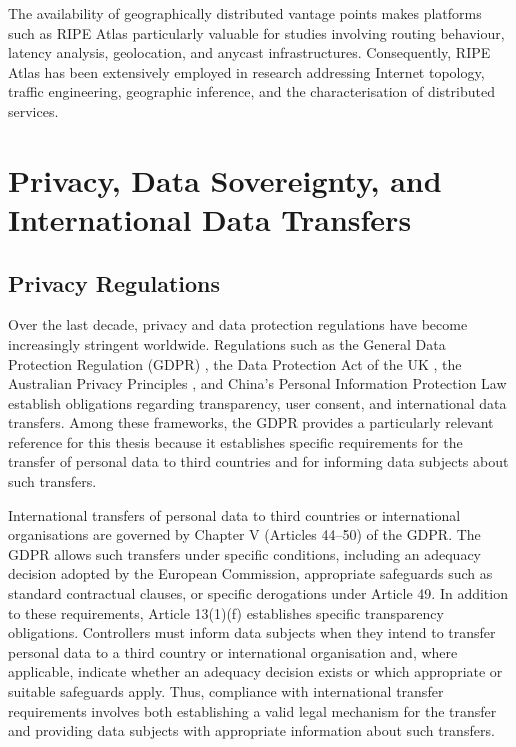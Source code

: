 The availability of geographically distributed vantage points makes platforms such as RIPE Atlas particularly valuable for studies involving routing behaviour, latency analysis, geolocation, and anycast infrastructures. Consequently, RIPE Atlas has been extensively employed in research addressing Internet topology, traffic engineering, geographic inference, and the characterisation of distributed services.

\section{Privacy, Data Sovereignty, and International Data Transfers}
\label{sc:background_privacy}

\subsection{Privacy Regulations}
\label{sc:background_privacy_regulations}

Over the last decade, privacy and data protection regulations have become increasingly stringent worldwide. Regulations such as the General Data Protection Regulation (GDPR) \cite{REGULATIONSRelevance}, the Data Protection Act of the UK \cite{Data2018}, the Australian Privacy Principles \cite{ReadOAIC}, and China's Personal Information Protection Law \cite{TheTranslation} establish obligations regarding transparency, user consent, and international data transfers. Among these frameworks, the GDPR provides a particularly relevant reference for this thesis because it establishes specific requirements for the transfer of personal data to third countries and for informing data subjects about such transfers.

International transfers of personal data to third countries or international organisations are governed by Chapter V (Articles 44--50) of the GDPR. The GDPR allows such transfers under specific conditions, including an adequacy decision adopted by the European Commission, appropriate safeguards such as standard contractual clauses, or specific derogations under Article 49. In addition to these requirements, Article 13(1)(f) establishes specific transparency obligations. Controllers must inform data subjects when they intend to transfer personal data to a third country or international organisation and, where applicable, indicate whether an adequacy decision exists or which appropriate or suitable safeguards apply. Thus, compliance with international transfer requirements involves both establishing a valid legal mechanism for the transfer and providing data subjects with appropriate information about such transfers. 

